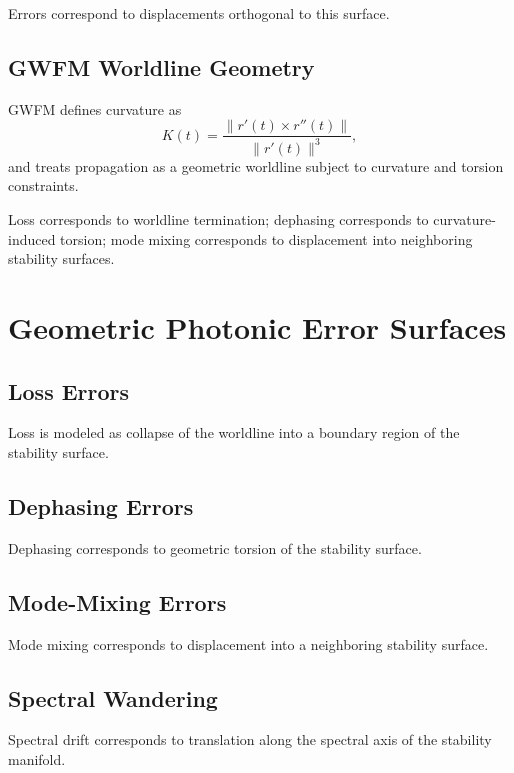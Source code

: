 \documentclass[aip, adv, reprint, superscriptaddress]{revtex4-2}
\begin{document}
Errors correspond to displacements orthogonal to this surface.

\subsection{GWFM Worldline Geometry}

GWFM defines curvature as
\begin{equation}
K(t) = \frac{\| r'(t) \times r''(t) \|}{\| r'(t) \|^3},
\end{equation}
and treats propagation as a geometric worldline subject to curvature and torsion 
constraints.

Loss corresponds to worldline termination; dephasing corresponds to curvature-induced 
torsion; mode mixing corresponds to displacement into neighboring stability surfaces.

\section{Geometric Photonic Error Surfaces}


\subsection{Loss Errors}

Loss is modeled as collapse of the worldline into a boundary region of the stability 
surface.

\subsection{Dephasing Errors}

Dephasing corresponds to geometric torsion of the stability surface.

\subsection{Mode-Mixing Errors}

Mode mixing corresponds to displacement into a neighboring stability surface.

\subsection{Spectral Wandering}

Spectral drift corresponds to translation along the spectral axis of the stability manifold.
\end{document}
